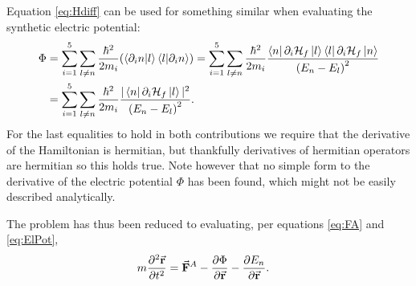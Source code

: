 \documentclass[a4paper]{article}
\begin{document}
Equation \ref{eq:Hdiff} can be used for something similar when evaluating the synthetic
electric potential:
\begin{align}\label{eq:ElPot}
        \Phi &= \sum_{i=1}^{5} \sum_{l \ne n} \frac{\hbar{}^2}{2m_i}\pqty{\bra{\partial_i
    n}\ket{l}\bra{l}\ket{\partial_i n}} = \sum_{i=1}^{5} \sum_{l \ne n}
    \frac{\hbar{}^2}{2m_i}\frac{\bra{n}\partial_i \mathbb{\cal H}_f\ket{l}\bra{l}\partial_i
    \mathbb{\cal H}_f\ket{n}}{\pqty{E_n-E_l}^2}\\
    &= \sum_{i=1}^{5} \sum_{l \ne n}
    \frac{\hbar{}^2}{2m_i}\frac{|\bra{n}\partial_i \mathbb{\cal H}_f\ket{l}|^2}{\pqty{E_n-E_l}^2}
.\end{align}
For the last equalities to hold in both contributions we require that the derivative of the Hamiltonian is
hermitian, but thankfully derivatives of hermitian operators are hermitian so this holds
true.
Note however that no simple form to the derivative of the electric potential \(\Phi\) has
been found, which might not be easily described analytically.

The problem has thus been reduced to evaluating, per equations \ref{eq:FA} and
\ref{eq:ElPot},
\begin{align}\label{eq:dynfin}
        m\frac{\partial^2 \va{r}}{\partial t^2} &= \va{F}^A-\frac{\partial \Phi}{\partial
        \va{r}} - \frac{\partial E_n}{\partial \va{r}} 
.\end{align}
\end{document}
